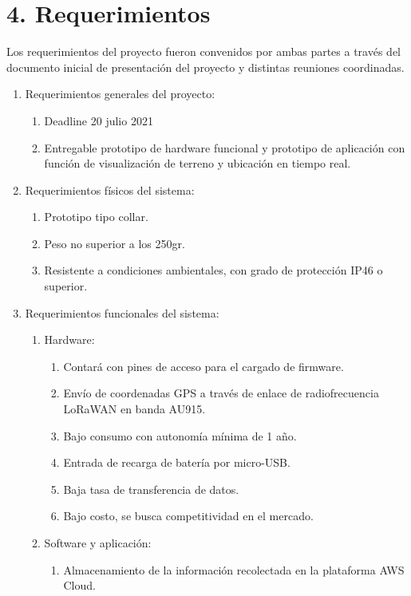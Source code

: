 \documentclass[11pt]{charter}
\begin{document}
\section{4. Requerimientos}
\label{sec:requerimientos}

Los requerimientos del proyecto fueron convenidos por ambas partes a través del documento inicial de presentación del proyecto y distintas reuniones coordinadas. 


\begin{enumerate}
\item Requerimientos generales del proyecto:
	\begin{enumerate}
	\item Deadline 20 julio 2021
	\item Entregable prototipo de hardware funcional y prototipo de aplicación con función de visualización de terreno y ubicación en tiempo real. 
	\end{enumerate}
\item Requerimientos físicos del sistema:
	\begin{enumerate}
	\item Prototipo tipo collar. 
	\item Peso no superior a los 250gr.
	\item Resistente a condiciones ambientales, con grado de protección IP46 o superior.
	\end{enumerate}
\item Requerimientos funcionales del sistema:
	\begin{enumerate}
	\item Hardware:
		\begin{enumerate}
		\item Contará con pines de acceso para el cargado de firmware.
		\item Envío de coordenadas GPS a través de enlace de radiofrecuencia LoRaWAN en banda AU915.
		\item Bajo consumo con autonomía mínima de 1 año.
		\item Entrada de recarga de batería por micro-USB.
		\item Baja tasa de transferencia de datos.
		\item Bajo costo, se busca competitividad en el mercado.
		\end{enumerate}
	\item Software y aplicación:
		\begin{enumerate}
		\item Almacenamiento de la información recolectada en la plataforma AWS Cloud.

\end{enumerate}
\end{enumerate}
\end{enumerate}
\end{document}
